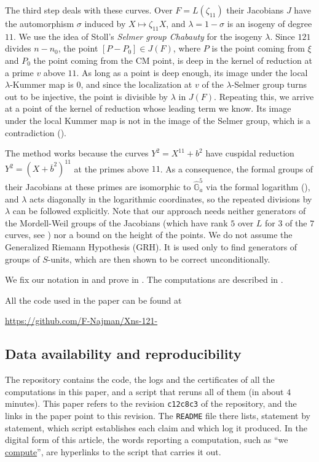 \documentclass[11pt,reqno]{amsart}
\newcommand{\repocommit}{c12c8c3705ed0b6b52254df69bd5ffe84542d568}
\newcommand{\reposhort}{c12c8c3}
\newcommand{\gitlink}[2]{\href{https://github.com/F-Najman/Xns-121-/blob/\repocommit/#1}{#2}}
\theoremstyle{definition}
\numberwithin{equation}{section}
\begin{document}
The third step deals with these curves. Over $F=L(\zeta_{11})$ their Jacobians $J$ have the automorphism $\sigma$ induced by $X\mapsto \zeta_{11} X$, and $\lambda=1-\sigma$ is an isogeny of degree $11$. We use the idea of Stoll's \textit{Selmer group Chabauty} \cite[Theorem 2.1 and Remark 2.2]{Stoll17} for the isogeny $\lambda$. Since $121$ divides $n-n_0$, the point $[P-P_0]\in J(F)$, where $P$ is the point coming from $\xi$ and $P_0$ the point coming from the CM point, is deep in the kernel of reduction at a prime $v$ above $11$. As long as a point is deep enough, its image under the local $\lambda$-Kummer map is $0$, and since the localization at $v$ of the $\lambda$-Selmer group turns out to be injective, the point is divisible by $\lambda$ in $J(F)$. Repeating this, we arrive at a point of the kernel of reduction whose leading term we know. Its image under the local Kummer map is not in the image of the Selmer group, which is a contradiction ().

The method works because the curves $Y^2=X^{11}+b^2$ have cuspidal reduction $Y^2=(X+\overline b^2)^{11}$ at the primes above $11$. As a consequence, the formal groups of their Jacobians at these primes are isomorphic to $\widehat{\mathbb G}_a^5$ via the formal logarithm (), and $\lambda$ acts diagonally in the logarithmic coordinates, so the repeated divisions by $\lambda$ can be followed explicitly. Note that our approach needs neither generators of the Mordell-Weil groups of the Jacobians (which have rank $5$ over $L$ for $3$ of the $7$ curves, see ) nor a bound on the height of the points. We do not assume the Generalized Riemann Hypothesis (GRH). It is used only to find generators of groups of $S$-units, which are then shown to be correct unconditionally.

We fix our notation in  and prove  in . The computations are described in .

All the code used in the paper can be found at
\begin{center} \url{https://github.com/F-Najman/Xns-121-} \end{center}

\subsection*{Data availability and reproducibility}
The repository contains the code, the logs and the certificates of all the computations in this paper, and a script that reruns all of them (in about $4$ minutes). This paper refers to the revision \texttt{\reposhort} of the repository, and the links in the paper point to this revision. The \texttt{README} file there lists, statement by statement, which script establishes each claim and which log it produced. In the digital form of this article, the words reporting a computation, such as ``we \gitlink{code/sieve_bruteforce.m}{compute}'', are hyperlinks to the script that carries it out.
\end{document}
